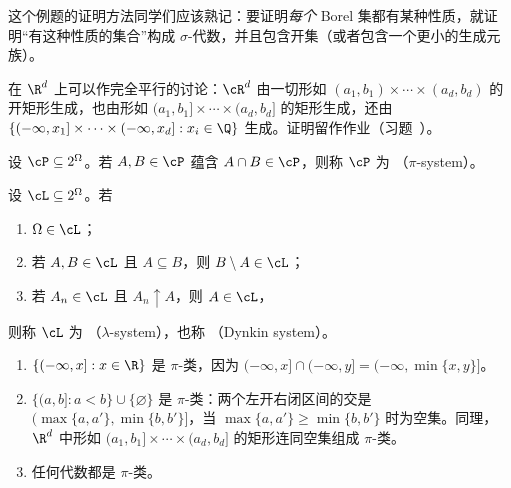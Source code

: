这个例题的证明方法同学们应该熟记：要证明\emph{每个} Borel 集都有某种性质，就证明“有这种性质的集合”构成 $\sigma$-代数，并且包含开集（或者包含一个更小的生成元族）。

在 $\R^d$ 上可以作完全平行的讨论：$\cR^d$ 由一切形如 $(a_1,b_1)\times\cdots\times(a_d,b_d)$ 的开矩形生成，也由形如 $(a_1,b_1]\times\cdots\times(a_d,b_d]$ 的矩形生成，还由 $\{(-\infty,x_1]\times\cdots\times(-\infty,x_d]: x_i\in\Q\}$ 生成。证明留作作业（习题~）。


\begin{definition}[$\pi$-类]\label{def:set-systems:pi}
设 $\cP\subseteq2^\Omega$。若 $A,B\in\cP$ 蕴含 $A\cap B\in\cP$，则称 $\cP$ 为 （$\pi$-system）。
\end{definition}

\begin{definition}[$\lambda$-类]\label{def:set-systems:lambda}
设 $\cL\subseteq2^\Omega$。若
\begin{enumerate}
\item $\Omega\in\cL$；
\item 若 $A,B\in\cL$ 且 $A\subseteq B$，则 $B\setminus A\in\cL$；
\item 若 $A_n\in\cL$ 且 $A_n\uparrow A$，则 $A\in\cL$，
\end{enumerate}
则称 $\cL$ 为 （$\lambda$-system），也称 （Dynkin system）。
\end{definition}

\begin{example}[$\pi$-类]\label{ex:set-systems:pi-examples}
\begin{enumerate}
\item $\{(-\infty,x]: x\in\R\}$ 是 $\pi$-类，因为 $(-\infty,x]\cap(-\infty,y]=(-\infty,\min\{x,y\}]$。
\item $\{(a,b]: a<b\}\cup\{\varnothing\}$ 是 $\pi$-类：两个左开右闭区间的交是 $(\max\{a,a'\},\min\{b,b'\}]$，当 $\max\{a,a'\}\geqslant\min\{b,b'\}$ 时为空集。同理，$\R^d$ 中形如 $(a_1,b_1]\times\cdots\times(a_d,b_d]$ 的矩形连同空集组成 $\pi$-类。
\item 任何代数都是 $\pi$-类。
\end{enumerate}
\end{example}

